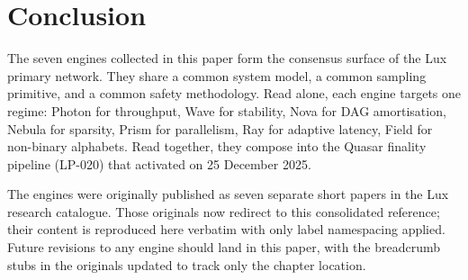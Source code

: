 \chapter{Conclusion}
\label{ch:lce-conclusion}

The seven engines collected in this paper form the consensus surface of
the Lux primary network. They share a common system model, a common
sampling primitive, and a common safety methodology. Read alone, each
engine targets one regime: Photon for throughput, Wave for stability,
Nova for DAG amortisation, Nebula for sparsity, Prism for parallelism,
Ray for adaptive latency, Field for non-binary alphabets. Read together,
they compose into the Quasar finality pipeline (LP-020) that activated
on 25 December 2025.

The engines were originally published as seven separate short papers in
the Lux research catalogue. Those originals now redirect to this
consolidated reference; their content is reproduced here verbatim with
only label namespacing applied. Future revisions to any engine should
land in this paper, with the breadcrumb stubs in the originals updated
to track only the chapter location.

